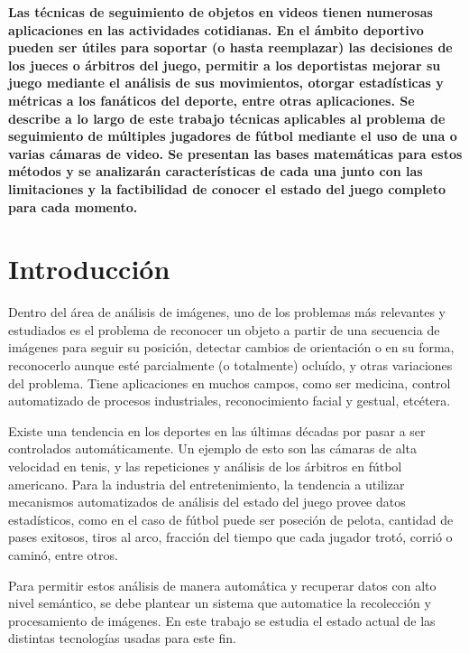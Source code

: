 \documentclass[a4paper,10pt]{article}
\title{}
\date{20 de Septiembre de 2013}
\author{Civile, Juan Pablo \and Crespo, Álvaro \and Ordano, Esteban }
\begin{document}
\pagestyle{fancy}
\maketitle
\thispagestyle{fancy}

\begin{customabstract}
\textbf{
Las técnicas de seguimiento de objetos en videos tienen numerosas aplicaciones
en las actividades cotidianas. En el ámbito deportivo pueden ser útiles para
soportar (o hasta reemplazar) las decisiones de los jueces o árbitros del
juego, permitir a los deportistas mejorar su juego mediante el análisis de sus
movimientos, otorgar estadísticas y métricas a los fanáticos del deporte, entre
otras aplicaciones. Se describe a lo largo de este trabajo técnicas aplicables
al problema de seguimiento de múltiples jugadores de fútbol mediante el uso de
una o varias cámaras de video. Se presentan las bases matemáticas para estos
métodos y se analizarán características de cada una junto con las limitaciones
y la factibilidad de conocer el estado del juego completo para cada momento.
} \end{customabstract}

\part*{Introducción}

Dentro del área de análisis de imágenes, uno de los problemas más relevantes y
estudiados es el problema de reconocer un objeto a partir de una secuencia de
imágenes para seguir su posición, detectar cambios de orientación o en su
forma, reconocerlo aunque esté parcialmente (o totalmente) ocluído, y otras
variaciones del problema. Tiene aplicaciones en muchos campos, como ser
medicina, control automatizado de procesos industriales, reconocimiento facial
y gestual, etcétera.

Existe una tendencia en los deportes en las últimas décadas por pasar a ser
controlados automáticamente. Un ejemplo de esto son las cámaras de alta
velocidad en tenis, y las repeticiones y análisis de los árbitros en fútbol
americano. Para la industria del entretenimiento, la tendencia a utilizar
mecanismos automatizados de análisis del estado del juego provee datos
estadísticos, como en el caso de fútbol puede ser poseción de pelota, cantidad
de pases exitosos, tiros al arco, fracción del tiempo que cada jugador trotó,
corrió o caminó, entre otros.

Para permitir estos análisis de manera automática y recuperar datos con alto
nivel semántico, se debe plantear un sistema que automatice la recolección
y procesamiento de imágenes. En este trabajo se estudia el estado
actual de las distintas tecnologías usadas para este fin.
\end{document}

